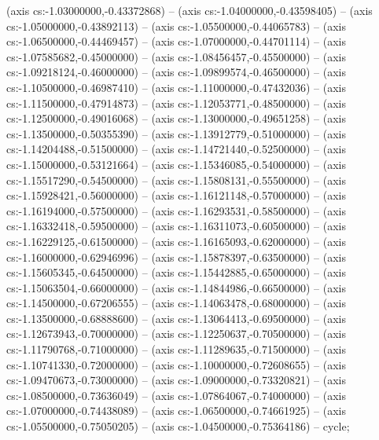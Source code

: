 (axis cs:-1.03000000,-0.43372868) -- (axis cs:-1.04000000,-0.43598405) -- (axis cs:-1.05000000,-0.43892113) -- (axis cs:-1.05500000,-0.44065783) -- (axis cs:-1.06500000,-0.44469457) -- (axis cs:-1.07000000,-0.44701114) -- (axis cs:-1.07585682,-0.45000000) -- (axis cs:-1.08456457,-0.45500000) -- (axis cs:-1.09218124,-0.46000000) -- (axis cs:-1.09899574,-0.46500000) -- (axis cs:-1.10500000,-0.46987410) -- (axis cs:-1.11000000,-0.47432036) -- (axis cs:-1.11500000,-0.47914873) -- (axis cs:-1.12053771,-0.48500000) -- (axis cs:-1.12500000,-0.49016068) -- (axis cs:-1.13000000,-0.49651258) -- (axis cs:-1.13500000,-0.50355390) -- (axis cs:-1.13912779,-0.51000000) -- (axis cs:-1.14204488,-0.51500000) -- (axis cs:-1.14721440,-0.52500000) -- (axis cs:-1.15000000,-0.53121664) -- (axis cs:-1.15346085,-0.54000000) -- (axis cs:-1.15517290,-0.54500000) -- (axis cs:-1.15808131,-0.55500000) -- (axis cs:-1.15928421,-0.56000000) -- (axis cs:-1.16121148,-0.57000000) -- (axis cs:-1.16194000,-0.57500000) -- (axis cs:-1.16293531,-0.58500000) -- (axis cs:-1.16332418,-0.59500000) -- (axis cs:-1.16311073,-0.60500000) -- (axis cs:-1.16229125,-0.61500000) -- (axis cs:-1.16165093,-0.62000000) -- (axis cs:-1.16000000,-0.62946996) -- (axis cs:-1.15878397,-0.63500000) -- (axis cs:-1.15605345,-0.64500000) -- (axis cs:-1.15442885,-0.65000000) -- (axis cs:-1.15063504,-0.66000000) -- (axis cs:-1.14844986,-0.66500000) -- (axis cs:-1.14500000,-0.67206555) -- (axis cs:-1.14063478,-0.68000000) -- (axis cs:-1.13500000,-0.68888600) -- (axis cs:-1.13064413,-0.69500000) -- (axis cs:-1.12673943,-0.70000000) -- (axis cs:-1.12250637,-0.70500000) -- (axis cs:-1.11790768,-0.71000000) -- (axis cs:-1.11289635,-0.71500000) -- (axis cs:-1.10741330,-0.72000000) -- (axis cs:-1.10000000,-0.72608655) -- (axis cs:-1.09470673,-0.73000000) -- (axis cs:-1.09000000,-0.73320821) -- (axis cs:-1.08500000,-0.73636049) -- (axis cs:-1.07864067,-0.74000000) -- (axis cs:-1.07000000,-0.74438089) -- (axis cs:-1.06500000,-0.74661925) -- (axis cs:-1.05500000,-0.75050205) -- (axis cs:-1.04500000,-0.75364186) -- cycle;
